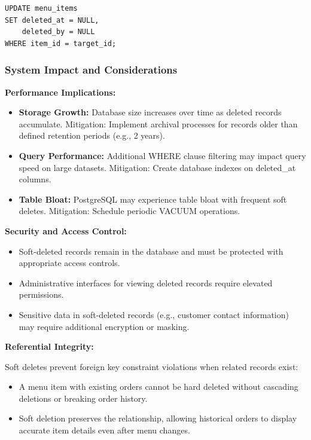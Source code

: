 \documentclass[12pt,a4paper]{article}
\begin{document}
\begin{verbatim}
UPDATE menu_items 
SET deleted_at = NULL,
    deleted_by = NULL
WHERE item_id = target_id;
\end{verbatim}

\subsubsection{System Impact and Considerations}

\textbf{Performance Implications:}

\begin{itemize}[leftmargin=2em, itemsep=6pt]
    \item \textbf{Storage Growth:} Database size increases over time as deleted records accumulate. Mitigation: Implement archival processes for records older than defined retention periods (e.g., 2 years).
    \item \textbf{Query Performance:} Additional WHERE clause filtering may impact query speed on large datasets. Mitigation: Create database indexes on deleted\_at columns.
    \item \textbf{Table Bloat:} PostgreSQL may experience table bloat with frequent soft deletes. Mitigation: Schedule periodic VACUUM operations.
\end{itemize}

\vspace{0.5em}

\textbf{Security and Access Control:}

\begin{itemize}[leftmargin=2em, itemsep=6pt]
    \item Soft-deleted records remain in the database and must be protected with appropriate access controls.
    \item Administrative interfaces for viewing deleted records require elevated permissions.
    \item Sensitive data in soft-deleted records (e.g., customer contact information) may require additional encryption or masking.
\end{itemize}

\vspace{0.5em}

\textbf{Referential Integrity:}

Soft deletes prevent foreign key constraint violations when related records exist:

\begin{itemize}[leftmargin=2em, itemsep=6pt]
    \item A menu item with existing orders cannot be hard deleted without cascading deletions or breaking order history.
    \item Soft deletion preserves the relationship, allowing historical orders to display accurate item details even after menu changes.
\end{itemize}
\end{document}
